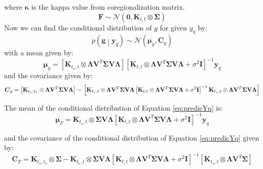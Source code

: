 where $\boldsymbol{\kappa}$ is the kappa value from coregionalization matrix.
\begin{equation} \label{eq:predictionF}
  \mathbf{F}  \sim \mathcal{N} \left( \mathbf{0},\mathbf{K}_{t,t} \otimes \boldsymbol{\Sigma}\right)
\end{equation}
Now we can find the conditional distribution of $g$ for given $y_q$ by:
\begin{equation}\label{eq:gGivenYq}
 p\left(\mathbf{g} \middle| \mathbf{y}_q\right) \sim 
    \mathcal{N} \left( \boldsymbol{\mu}_g, \mathbf{C}_g\right)
\end{equation}
with a mean given by:
\begin{equation} \label{eq:prediction_MuG}
  \boldsymbol{\mu}_g = 
    \left[ \mathbf{K}_{t_\star,t} \otimes \boldsymbol{\Lambda} \mathbf{V}^T\boldsymbol{\Sigma} \mathbf{V} \boldsymbol{\Lambda}  \right] 
    \left[ \mathbf{K}_{t,t} \otimes \boldsymbol{\Lambda} \mathbf{V}^T\boldsymbol{\Sigma} \mathbf{V} \boldsymbol{\Lambda} + \sigma^2 \mathbf{I} \right]^{-1}\mathbf{y}_q
\end{equation}
and the covariance given by:
\begin{equation} \label{eq:prediction_Cg}
\boldsymbol{C}_g = 
    \left[ \mathbf{K}_{t_\star,t_\star} \otimes \boldsymbol{\Lambda} \mathbf{V}^T\boldsymbol{\Sigma} \mathbf{V} \boldsymbol{\Lambda}  \right] - \\
    \left[ \mathbf{K}_{t_\star,t} \otimes \boldsymbol{\Lambda} \mathbf{V}^T\boldsymbol{\Sigma} \mathbf{V} \boldsymbol{\Lambda}  
    \left[ \mathbf{K}_{t,t} \otimes \boldsymbol{\Lambda} \mathbf{V}^T\boldsymbol{\Sigma} \mathbf{V} \boldsymbol{\Lambda} + \sigma^2 \mathbf{I} \right]^{-1} 
    \mathbf{K}_{t_\star,t} \otimes \boldsymbol{\Lambda} \mathbf{V}^T\boldsymbol{\Sigma} \mathbf{V} \boldsymbol{\Lambda} \right]
\end{equation}

The mean of the conditional distribution of Equation \ref{eq:predicYq} %
is:
\begin{equation} \label{eq:prediction_MuF}
  \boldsymbol{\mu}_F = 
    \mathbf{K}_{t_\star,t} \otimes \boldsymbol{\Sigma} \mathbf{V} \boldsymbol{\Lambda}
    \left[ \mathbf{K}_{t,t} \otimes \boldsymbol{\Lambda} \mathbf{V}^T\boldsymbol{\Sigma} \mathbf{V} \boldsymbol{\Lambda} + \sigma^2 \mathbf{I} \right]^{-1}\mathbf{y}_q
\end{equation}

and the covariance of the conditional distribution of Equation \ref{eq:predicYq} %
given by:
\begin{equation} \label{eq:prediction_CF}
  \boldsymbol{C}_F = 
    \mathbf{K}_{t_\star,t_\star} \otimes \boldsymbol{\Sigma} -
    \mathbf{K}_{t_\star,t} \otimes \boldsymbol{\Sigma}\mathbf{V} \boldsymbol{\Lambda}
    \left[ \mathbf{K}_{t,t} \otimes \boldsymbol{\Lambda} \mathbf{V}^T\boldsymbol{\Sigma} \mathbf{V} \boldsymbol{\Lambda} + \sigma^2 \mathbf{I} \right]^{-1} 
    \left[ \mathbf{K}_{t_\star,t} \otimes \boldsymbol{\Lambda} \mathbf{V}^T\boldsymbol{\Sigma}\right]
\end{equation}

